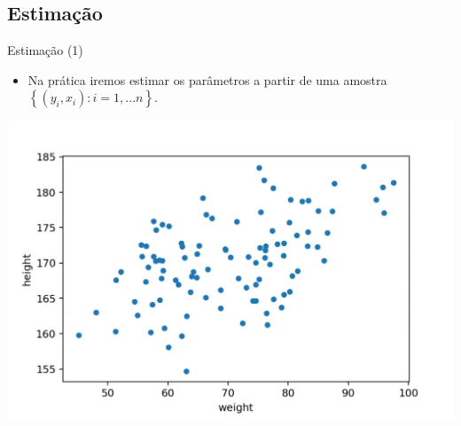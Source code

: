 \documentclass[10pt,slides,xcolor=pdftex,dvipsnames,table]{beamer}
\begin{document}

\subsection{Estimação}

    
\begin{frame}{Estimação (1)}

    \begin{itemize}\itemsep1.2em
    
     \item Na prática iremos estimar os parâmetros a partir de uma amostra $\left\{ (y_i, x_{i}): i=1,...n \right\}$.  
	 
	 \end{itemize}
	 
	 \centering
    \includegraphics[height=0.7\textheight]{scatter}
    
\end{frame}

\end{document}
